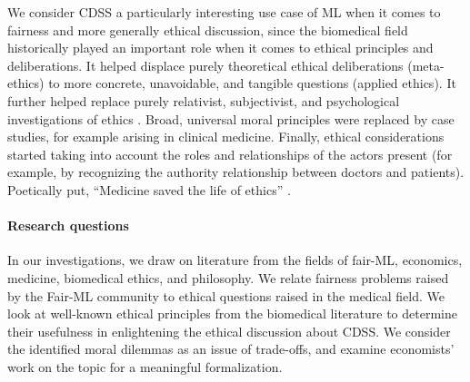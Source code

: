 We consider CDSS a particularly interesting use case of ML when it comes to fairness and more generally ethical discussion, since the biomedical field historically played an important role when it comes to ethical principles and deliberations.
It helped displace purely theoretical ethical deliberations (meta-ethics) to more concrete, unavoidable, and tangible questions (applied ethics).
It further helped replace purely relativist, subjectivist, and psychological investigations of ethics \cite{Toulmin1982}.
Broad, universal moral principles were replaced by case studies, for example arising in clinical medicine.
Finally, ethical considerations started taking into account the roles and relationships of the actors present (for example, by recognizing the authority relationship between doctors and patients).
Poetically put, ``Medicine saved the life of ethics'' \cite{Toulmin1982}.

\paragraph{Research questions}

In our investigations, we draw on literature from the fields of fair-ML, economics, medicine, biomedical ethics, and philosophy.
We relate fairness problems raised by the Fair-ML community to ethical questions raised in the medical field.
We look at well-known ethical principles from the biomedical literature to determine their usefulness in enlightening the ethical discussion about CDSS.
We consider the identified moral dilemmas as an issue of trade-offs, and examine economists' work on the topic for a meaningful formalization.

